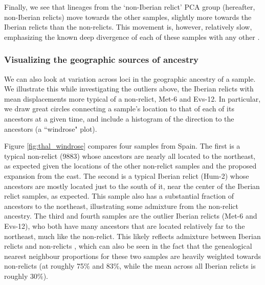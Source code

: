 \documentclass[12pt]{article}
\begin{document}
Finally, we see that lineages from the `non-Iberian relict' PCA group (hereafter, non-Iberian relicts) move towards the other samples, slightly more towards the Iberian relicts than the non-relicts.
This movement is, however, relatively slow, emphasizing the known deep divergence of each of these samples with any other \citep{alonso2016,fulgione2018madeiran,fulgione2018archaic,fulgione2022parallel}.

\subsubsection*{Visualizing the geographic sources of ancestry}

We can also look at variation across loci in the geographic ancestry of a sample.
We illustrate this while investigating the outliers above, the Iberian relicts with mean displacements more typical of a non-relict, Met-6 and Evs-12.
In particular, we draw great circles connecting a sample's location to that of each of its ancestors at a given time, and include a histogram of the direction to the ancestors (a ``windrose" plot). 

Figure \ref{fig:thal_windrose} compares four samples from Spain.
The first is a typical non-relict (9883) whose ancestors are nearly all located to the northeast, as expected given the locations of the other non-relict samples and the proposed expansion from the east. 
The second is a typical Iberian relict (Hum-2) whose ancestors are mostly located just to the south of it, near the center of the Iberian relict samples, as expected.
This sample also has a substantial fraction of ancestors to the northeast, illustrating some admixture from the non-relict ancestry.
The third and fourth samples are the outlier Iberian relicts (Met-6 and Evs-12), who both have many ancestors that are located relatively far to the northeast, much like the non-relict.
This likely reflects admixture between Iberian relicts and non-relicts \citep{alonso2016,fulgione2018archaic}, which can also be seen in the fact that the genealogical nearest neighbour proportions \citep{kelleher2019inferring} for these two samples are heavily weighted towards non-relicts (at roughly 75\% and 83\%, while the mean across all Iberian relicts is roughly 30\%).
\end{document}
